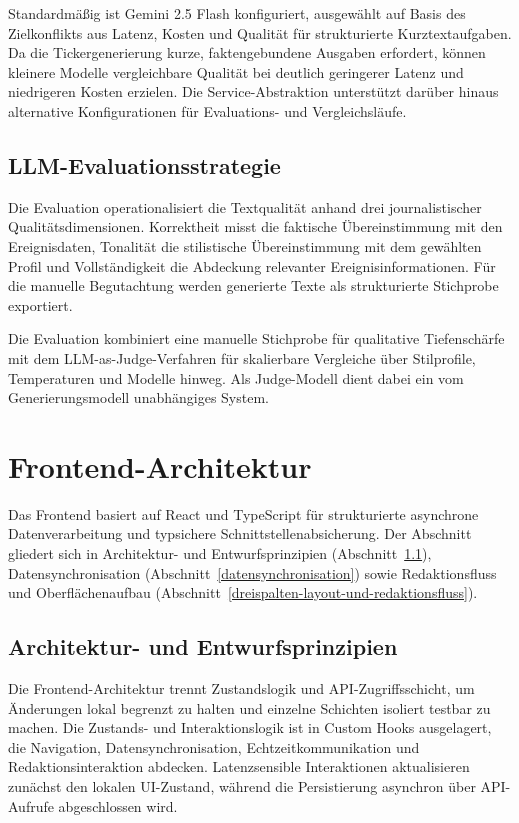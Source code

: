 Standardmäßig ist Gemini 2.5 Flash konfiguriert, ausgewählt auf Basis des Zielkonflikts aus Latenz, Kosten und Qualität für strukturierte Kurztextaufgaben. Da die Tickergenerierung kurze, faktengebundene Ausgaben erfordert, können kleinere Modelle vergleichbare Qualität bei deutlich geringerer Latenz und niedrigeren Kosten erzielen. Die Service-Abstraktion unterstützt darüber hinaus alternative Konfigurationen für Evaluations- und Vergleichsläufe.

\subsection{LLM-Evaluationsstrategie}\label{evaluationsstrategie-llm}

Die Evaluation operationalisiert die Textqualität anhand drei journalistischer Qualitätsdimensionen. Korrektheit misst die faktische Übereinstimmung mit den Ereignisdaten, Tonalität die stilistische Übereinstimmung mit dem gewählten Profil und Vollständigkeit die Abdeckung relevanter Ereignisinformationen. Für die manuelle Begutachtung werden generierte Texte als strukturierte Stichprobe exportiert.

Die Evaluation kombiniert eine manuelle Stichprobe für qualitative Tiefenschärfe mit dem LLM-as-Judge-Verfahren für skalierbare Vergleiche über Stilprofile, Temperaturen und Modelle hinweg. Als Judge-Modell dient dabei ein vom Generierungsmodell unabhängiges System.

\section{Frontend-Architektur}\label{frontend-konzeption}

Das Frontend basiert auf React und TypeScript für strukturierte asynchrone Datenverarbeitung und typsichere Schnittstellenabsicherung. Der Abschnitt gliedert sich in Architektur- und Entwurfsprinzipien (Abschnitt~\ref{architekturprinzipien}), Datensynchronisation (Abschnitt~\ref{datensynchronisation}) sowie Redaktionsfluss und Oberflächenaufbau (Abschnitt~\ref{dreispalten-layout-und-redaktionsfluss}).

\subsection{Architektur- und Entwurfsprinzipien}\label{architekturprinzipien}

Die Frontend-Architektur trennt Zustandslogik und API-Zugriffsschicht, um Änderungen lokal begrenzt zu halten und einzelne Schichten isoliert testbar zu machen. Die Zustands- und Interaktionslogik ist in Custom Hooks ausgelagert, die Navigation, Datensynchronisation, Echtzeitkommunikation und Redaktionsinteraktion abdecken. Latenzsensible Interaktionen aktualisieren zunächst den lokalen UI-Zustand, während die Persistierung asynchron über API-Aufrufe abgeschlossen wird.

